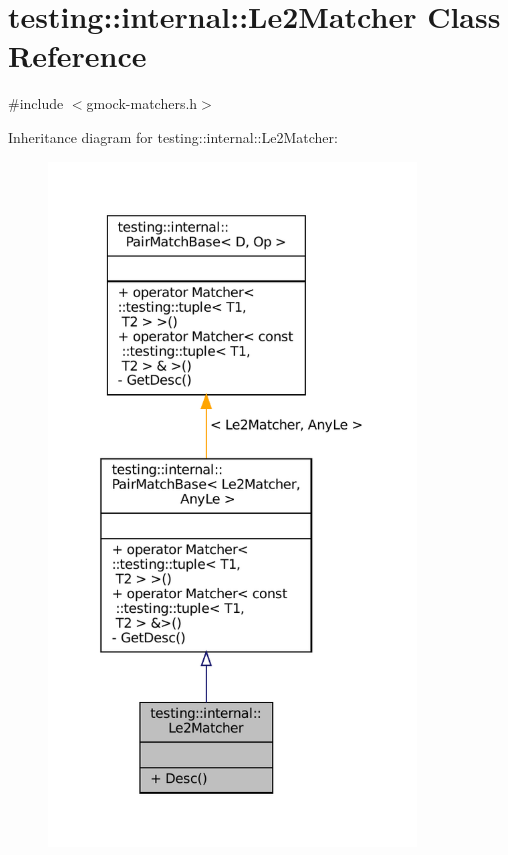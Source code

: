 \hypertarget{classtesting_1_1internal_1_1Le2Matcher}{}\section{testing\+:\+:internal\+:\+:Le2\+Matcher Class Reference}
\label{classtesting_1_1internal_1_1Le2Matcher}


{\ttfamily \#include $<$gmock-\/matchers.\+h$>$}



Inheritance diagram for testing\+:\+:internal\+:\+:Le2\+Matcher\+:
\nopagebreak
\begin{figure}[H]
\begin{center}
\leavevmode
\includegraphics[width=277pt]{classtesting_1_1internal_1_1Le2Matcher__inherit__graph}
\end{center}
\end{figure}


